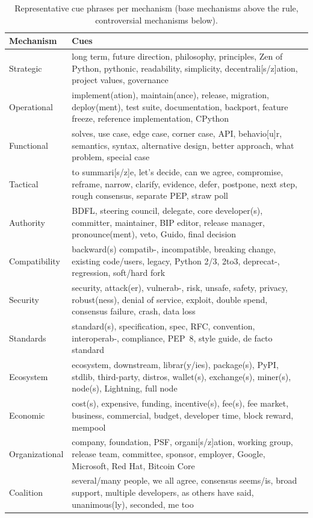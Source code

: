 \begin{table}[t]
\caption{Representative cue phrases per mechanism (base mechanisms above the rule, controversial mechanisms below).}
\label{tab:cues}
\small
\begin{tabular}{p{}p{}}
\toprule
Mechanism & Cues \\
\midrule
Strategic & long term, future direction, philosophy, principles, Zen of Python, pythonic, readability, simplicity, decentrali[s/z]ation, project values, governance \\
Operational & implement(ation), maintain(ance), release, migration, deploy(ment), test suite, documentation, backport, feature freeze, reference implementation, CPython \\
Functional & solves, use case, edge case, corner case, API, behavio[u]r, semantics, syntax, alternative design, better approach, what problem, special case \\
Tactical & to summari[s/z]e, let's decide, can we agree, compromise, reframe, narrow, clarify, evidence, defer, postpone, next step, rough consensus, separate PEP, straw poll \\
Authority & BDFL, steering council, delegate, core developer(s), committer, maintainer, BIP editor, release manager, pronounce(ment), veto, Guido, final decision \\
Compatibility & backward(s) compatib-, incompatible, breaking change, existing code/users, legacy, Python 2/3, 2to3, deprecat-, regression, soft/hard fork \\
Security & security, attack(er), vulnerab-, risk, unsafe, safety, privacy, robust(ness), denial of service, exploit, double spend, consensus failure, crash, data loss \\
Standards & standard(s), specification, spec, RFC, convention, interoperab-, compliance, PEP~8, style guide, de facto standard \\
Ecosystem & ecosystem, downstream, librar(y/ies), package(s), PyPI, stdlib, third-party, distros, wallet(s), exchange(s), miner(s), node(s), Lightning, full node \\
Economic & cost(s), expensive, funding, incentive(s), fee(s), fee market, business, commercial, budget, developer time, block reward, mempool \\
Organizational & company, foundation, PSF, organi[s/z]ation, working group, release team, committee, sponsor, employer, Google, Microsoft, Red Hat, Bitcoin Core \\
Coalition & several/many people, we all agree, consensus seems/is, broad support, multiple developers, as others have said, unanimous(ly), seconded, me too \\

\end{tabular}
\end{table}
